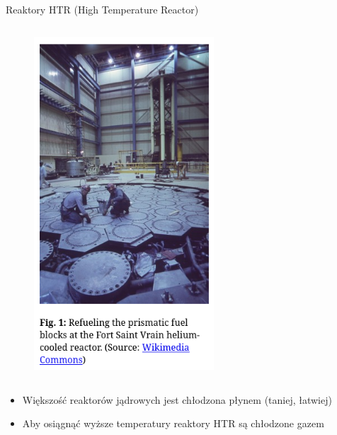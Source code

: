 \begin{columnframe}{Reaktory HTR (High Temperature Reactor)}
    \begin{column}{0.5\textwidth}
        \begin{figure}
            \centering
            \includegraphics[width=0.6\textwidth, frame]{images/ft_st_vrain_refuel.png}
        \end{figure}
    \end{column}
    \begin{column}{0.5\textwidth}
        \begin{itemize}
            \item Większość reaktorów jądrowych jest chłodzona płynem (taniej, łatwiej)
            \item Aby osiągnąć wyższe temperatury reaktory HTR są chłodzone gazem
        \end{itemize}
    \end{column}
\end{columnframe}

